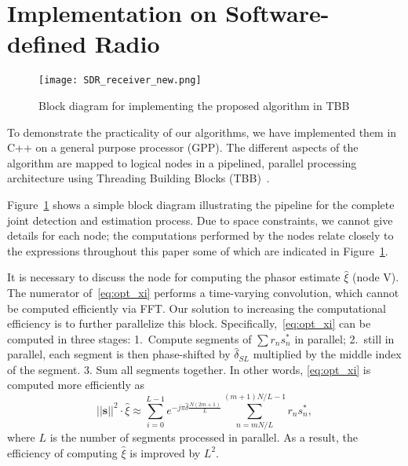 \section{Implementation on Software-defined Radio}%
\label{sec:implementation_on_SDR}

\begin{figure}[t]
    \centerline{\texttt{[image: SDR\_receiver\_new.png]}}
    \caption{Block diagram for implementing the proposed algorithm in TBB}
    \label{fig:SDR_receiver}
    \end{figure}

To demonstrate the practicality of our algorithms, we have implemented them in C++ on a general
purpose processor (GPP).
The different aspects of the algorithm are mapped to logical nodes in a pipelined, parallel processing architecture
using Threading Building Blocks (TBB)~\cite{Michael_19}.

Figure~\ref{fig:SDR_receiver} shows a simple block diagram
illustrating the pipeline for the complete joint detection and
estimation process.
Due to space constraints, we cannot give details for each node; the
computations performed by the nodes relate closely to the expressions
throughout this paper some of which are indicated in Figure~\ref{fig:SDR_receiver}.

It is necessary to discuss the node for computing the phasor estimate $\hat{\xi}$ (node V). 
The numerator of~\eqref{eq:opt_xi} performs a time-varying
convolution,
which cannot be computed efficiently via FFT.
Our solution to increasing the computational efficiency is to further
parallelize this block.
Specifically,~\eqref{eq:opt_xi} can be computed in three stages:
1.~Compute  segments of $\sum r_ns_n^*$ in  parallel;
2.~still in parallel, each segment is then phase-shifted by $\hat{\delta}_{SL}$
multiplied by the middle index of the 
segment.
3. Sum all segments together.
In other words, \eqref{eq:opt_xi} is computed more efficiently as
\begin{equation}
  \label{eq:refined_opt_S}
  ||\bm{s}||^2\cdot\hat{\xi} \approx \sum_{i=0}^{L-1} e^{-j\pi \hat{\delta}\frac{N(2m+1)}{L}}
  \sum_{n=mN/L}^{(m+1)N/L-1}r_ns_n^*,
\end{equation}
where $L$ is the number of segments processed in parallel.
As a result,
the efficiency of computing $\hat{\xi}$ is improved by $L^2$.

